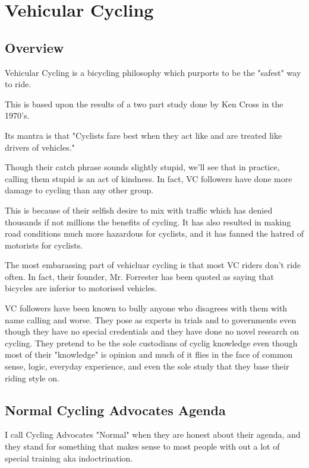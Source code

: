 \chapter{Vehicular Cycling}

\section{Overview}

Vehicular Cycling is a bicycling philosophy which purports to be the "safest" way to ride.

This is based upon the results of a two part study done by Ken Cross in the 1970's.

Its mantra is that "Cyclists fare best when they act like and are treated like
drivers of vehicles."

Though their catch phrase sounds slightly stupid, we'll see that in practice,
calling them stupid is an act of kindness. In fact, VC followers have done more
damage to cycling than any other group. 

This is because of their selfish desire to mix with traffic which has denied
thousands if not millions the benefits of cycling. It has also resulted in
making road conditions much more hazardous for cyclists, and it has fanned the
hatred of motorists for cyclists.

The most embarassing part of vehicluar cycling is that most VC riders don't
ride often. In fact, their founder, Mr. Forrester has been quoted as saying
that bicycles are inferior to motorised vehicles.

VC followers have been known to bully anyone who disagrees with them with name
calling and worse. They pose as experts in trials and to governments even
though they have no special credentials and they have done no novel research on
cycling. They pretend to be the sole custodians of cyclig knowledge even though
most of their "knowledge" is opinion and much of it flies in the face of common
sense, logic, everyday experience, and even the sole study that they base their
riding style on.

\section{Normal Cycling Advocates Agenda}

I call Cycling Advocates "Normal" when they are honest about their agenda, and they stand for something that makes sense to most people with out a lot of special training aka indoctrination.

